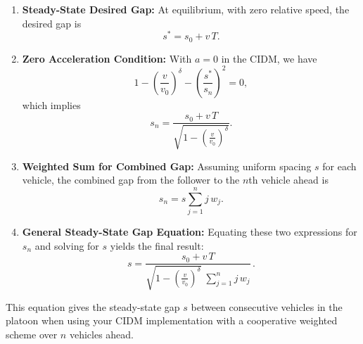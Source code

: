 \documentclass{article}
\begin{document}
\begin{enumerate}
    \item \textbf{Steady-State Desired Gap:}  
    At equilibrium, with zero relative speed, the desired gap is  
    \[
    s^* = s_0 + v\,T.
    \]
    
    \item \textbf{Zero Acceleration Condition:}  
    With \(a=0\) in the CIDM, we have  
    \[
    1 - \left(\frac{v}{v_0}\right)^\delta - \left(\frac{s^*}{s_n}\right)^2 = 0,
    \]
    which implies  
    \[
    s_n = \frac{s_0+v\,T}{\sqrt{1 - \left(\frac{v}{v_0}\right)^\delta}}.
    \]
    
    \item \textbf{Weighted Sum for Combined Gap:}  
    Assuming uniform spacing \(s\) for each vehicle, the combined gap from the follower to the \(n\)th vehicle ahead is  
    \[
    s_n = s \sum_{j=1}^{n} j\,w_j.
    \]
    
    \item \textbf{General Steady-State Gap Equation:}  
    Equating these two expressions for \(s_n\) and solving for \(s\) yields the final result:
    \[
    s = \frac{s_0+v\,T}{\sqrt{1 - \left(\frac{v}{v_0}\right)^\delta}\;\displaystyle\sum_{j=1}^{n} j\,w_j}\,.
    \]
\end{enumerate}

This equation gives the steady-state gap \(s\) between consecutive vehicles in the platoon when using your CIDM implementation with a cooperative weighted scheme over \(n\) vehicles ahead.
\end{document}
